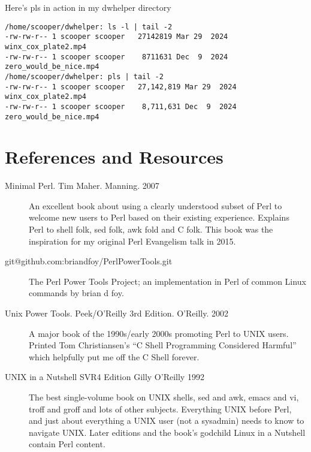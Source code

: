 \documentclass{article}
\begin{document}
Here's pls in action in my dwhelper directory
\begin{verbatim}
/home/scooper/dwhelper: ls -l | tail -2
-rw-rw-r-- 1 scooper scooper   27142819 Mar 29  2024 winx_cox_plate2.mp4
-rw-rw-r-- 1 scooper scooper    8711631 Dec  9  2024 zero_would_be_nice.mp4
/home/scooper/dwhelper: pls | tail -2
-rw-rw-r-- 1 scooper scooper   27,142,819 Mar 29  2024 winx_cox_plate2.mp4
-rw-rw-r-- 1 scooper scooper    8,711,631 Dec  9  2024 zero_would_be_nice.mp4
\end{verbatim}

\section*{References and Resources}

\begin{description}

\item[Minimal Perl. Tim Maher. Manning. 2007] An excellent book about
  using a clearly understood subset of Perl to welcome new users to
  Perl based on their existing experience. Explains Perl to shell
  folk, sed folk, awk fold and C folk. This book was the inspiration
  for my original Perl Evangelism talk in 2015.

\item[git@github.com:briandfoy/PerlPowerTools.git] The Perl Power
  Tools Project; an implementation in Perl of common Linux commands by
  brian d foy.

\item[Unix Power Tools. Peek/O'Reilly 3rd Edition. O'Reilly. 2002] A
  major book of the 1990s/early 2000s promoting Perl to UNIX users.
  Printed Tom Christiansen's ``C Shell Programming Considered
  Harmful'' which helpfully put me off the C Shell forever.

\item[UNIX in a Nutshell SVR4 Edition Gilly O'Reilly 1992] The best
  single-volume book on UNIX shells, sed and awk, emacs and vi, troff
  and groff and lots of other subjects. Everything UNIX before Perl,
  and just about everything a UNIX user (not a sysadmin) needs to know
  to navigate UNIX. Later editions and the book's godchild Linux in a
  Nutshell contain Perl content.


\end{description}
\end{document}
